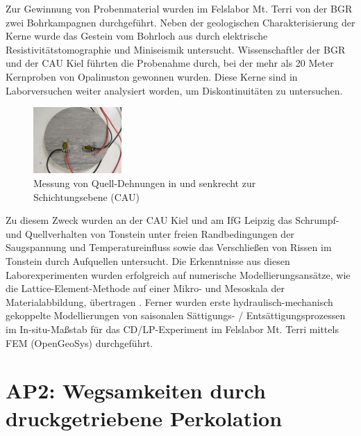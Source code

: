 Zur Gewinnung von Probenmaterial wurden im Felslabor Mt. Terri von der BGR zwei Bohrkampagnen durchgeführt. Neben der geologischen Charakterisierung der Kerne wurde das Gestein vom Bohrloch aus durch elektrische Resistivitätstomographie und Miniseismik untersucht. Wissenschaftler der BGR und der CAU Kiel führten die Probenahme durch, bei der mehr als 20 Meter Kernproben von Opalinuston gewonnen wurden. Diese Kerne sind in Laborversuchen weiter analysiert worden, um Diskontinuitäten zu untersuchen. 
\begin{figure}
\includegraphics[width=0.3\textwidth]{figures/CAU_shrink_exp_01.jpg}
\caption{Messung von Quell-Dehnungen in und senkrecht zur Schichtungsebene (CAU)}
\label{fig:wp1}
\end{figure}
Zu diesem Zweck wurden an der CAU Kiel und am IfG Leipzig das Schrumpf- und Quellverhalten von Tonstein unter freien Randbedingungen der Saugspannung und Temperatureinfluss sowie das Verschließen von Rissen im Tonstein durch Aufquellen untersucht. Die Erkenntnisse aus diesen Laborexperimenten wurden erfolgreich auf numerische Modellierungsansätze, wie die Lattice-Element-Methode auf einer Mikro- und Mesoskala der Materialabbildung, übertragen \cite{Sattari2019266, Shrestha20191671,Rizvi2020}. Ferner wurden erste hydraulisch-mechanisch gekoppelte Modellierungen von saisonalen Sättigungs- / Entsättigungsprozessen im In-situ-Maßstab für das CD/LP-Experiment im Felslabor Mt. Terri mittels FEM (OpenGeoSys) durchgeführt.

\section*{AP2: Wegsamkeiten durch druckgetriebene Perkolation}
\label{sec:wp2}

